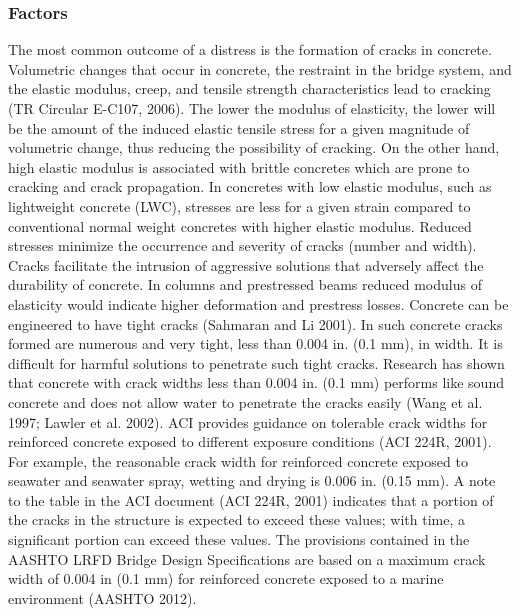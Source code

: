 \subsubsection{Factors}
The most common outcome of a distress is the formation of cracks in concrete. Volumetric changes that occur in
concrete, the restraint in the bridge system, and the elastic modulus, creep, and tensile strength characteristics lead to
cracking (TR Circular E-C107, 2006). The lower the modulus of elasticity, the lower will be the amount of the induced elastic tensile stress for a given magnitude of volumetric change, thus reducing the possibility of cracking.
On the other hand, high elastic modulus is associated with brittle concretes which are prone to cracking and crack
propagation. In concretes with low elastic modulus, such as lightweight concrete (LWC), stresses are less for a given
strain compared to conventional normal weight concretes with higher elastic modulus. Reduced stresses minimize the
occurrence and severity of cracks (number and width). Cracks facilitate the intrusion of aggressive solutions that
adversely affect the durability of concrete. In columns and prestressed beams reduced modulus of elasticity would
indicate higher deformation and prestress losses. Concrete can be engineered to have tight cracks (Sahmaran and Li
2001). In such concrete cracks formed are numerous and very tight, less than 0.004 in. (0.1 mm), in width. It is
difficult for harmful solutions to penetrate such tight cracks. Research has shown that concrete with crack widths
less than 0.004 in. (0.1 mm) performs like sound concrete and does not allow water to penetrate the cracks easily
(Wang et al. 1997; Lawler et al. 2002). ACI provides guidance on tolerable crack widths for reinforced concrete
exposed to different exposure conditions (ACI 224R, 2001). For example, the reasonable crack width for reinforced
concrete exposed to seawater and seawater spray, wetting and drying is 0.006 in. (0.15 mm). A note to the table in
the ACI document (ACI 224R, 2001) indicates that a portion of the cracks in the structure is expected to exceed these
values; with time, a significant portion can exceed these values. The provisions contained in the AASHTO LRFD
Bridge Design Specifications are based on a maximum crack width of 0.004 in (0.1 mm) for reinforced concrete
exposed to a marine environment (AASHTO 2012).

